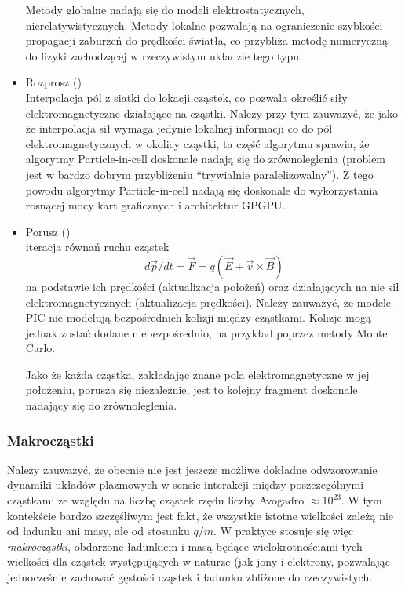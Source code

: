 \begin{itemize}
    Metody globalne nadają się do modeli elektrostatycznych,
    nierelatywistycznych.  Metody lokalne pozwalają na ograniczenie szybkości
    propagacji zaburzeń do prędkości światła, co przybliża metodę numeryczną do
    fizyki zachodzącej w rzeczywistym układzie tego typu.
    \item Rozprosz () \\
    Interpolacja pól z siatki do lokacji cząstek, co pozwala określić siły
    elektromagnetyczne działające na cząstki.  Należy przy tym zauważyć, że
    jako że interpolacja sił wymaga jedynie lokalnej informacji co do pól
    elektromagnetycznych w okolicy cząstki, ta część algorytmu sprawia, że
    algorytmy Particle-in-cell doskonale nadają się do zrównoleglenia (problem
    jest w bardzo dobrym przybliżeniu ``trywialnie paralelizowalny''). Z tego
    powodu algorytmy Particle-in-cell nadają się doskonale do wykorzystania
    rosnącej mocy kart graficznych i architektur GPGPU.
    \item Porusz () \\
    iteracja równań ruchu cząstek
    \begin{equation}
        d \vec{p}/dt = \vec{F} = q (\vec{E} + \vec{v} \times \vec{B})
        \label{eq-of-motion}
    \end{equation}
    na podstawie ich prędkości (aktualizacja położeń) oraz działających na nie
    sił elektromagnetycznych (aktualizacja prędkości). Należy zauważyć, że
    modele PIC nie modelują bezpośrednich kolizji między cząstkami. Kolizje
    mogą jednak zostać dodane niebezpośrednio, na przykład poprzez metody Monte
    Carlo.

    Jako że każda cząstka, zakładając znane pola elektromagnetyczne w jej
    położeniu, porusza się niezależnie, jest to kolejny fragment doskonale
    nadający się do zrównoleglenia.
    \end{itemize}
    \subsubsection{Makrocząstki}
    Należy zauważyć, że obecnie nie jest jeszcze możliwe dokładne odwzorowanie
    dynamiki układów plazmowych w sensie interakcji między poszczególnymi
    cząstkami ze względu na liczbę cząstek rzędu liczby Avogadro $\approx
    10^{23}$.  W tym kontekście bardzo szczęśliwym jest fakt, że wszystkie
    istotne wielkości zależą nie od ładunku ani masy, ale od stosunku $q/m$. W
    praktyce stosuje się więc \emph{makrocząstki}, obdarzone ładunkiem i masą
    będące wielokrotnościami tych wielkości dla cząstek występujących w naturze
    (jak jony i elektrony, pozwalając jednocześnie zachować gęstości cząstek i
    ładunku zbliżone do rzeczywistych.

